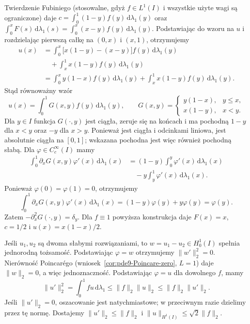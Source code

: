 \begin{przyklad}
Twierdzenie Fubiniego (stosowalne, gdyż $f\in L^1(I)$
i wszystkie użyte wagi są ograniczone) daje
$c=\int_0^1(1-y)f(y)\,\mathrm d\lambda_1(y)$ oraz
$\int_0^xF(s)\,\mathrm d\lambda_1(s)
=\int_0^x(x-y)f(y)\,\mathrm d\lambda_1(y)$.
Podstawiając do wzoru na $u$ i rozdzielając
pierwszą całkę na $(0,x)$ i $(x,1)$, otrzymujemy
\[
 \begin{aligned}
 u(x)
 &=\int_0^x\bigl[x(1-y)-(x-y)\bigr]f(y)\,
                  \mathrm d\lambda_1(y)\\
 &\quad+\int_x^1 x(1-y)f(y)\,\mathrm d\lambda_1(y)\\
 &=\int_0^x y(1-x)f(y)\,\mathrm d\lambda_1(y)
   +\int_x^1 x(1-y)f(y)\,\mathrm d\lambda_1(y).
 \end{aligned}
\]
Stąd równoważny wzór
\[
 u(x)=\int_0^1G(x,y)f(y)\,\mathrm d\lambda_1(y),\qquad
 G(x,y)=\begin{cases}y(1-x),&y\le x,\\x(1-y),&x<y.\end{cases}
\]
Dla $y\in I$ funkcja $G(\cdot,y)$ jest ciągła,
zeruje się na końcach i ma pochodną $1-y$ dla $x<y$
oraz $-y$ dla $x>y$. Ponieważ jest ciągła
i odcinkami liniowa, jest absolutnie ciągła na $[0,1]$;
wskazana pochodna jest więc również pochodną słabą.
Dla $\varphi\in C_c^\infty(I)$ mamy
\[
 \begin{aligned}
 \int_0^1\partial_xG(x,y)\varphi'(x)\,\mathrm d\lambda_1(x)
 &=(1-y)\int_0^y\varphi'(x)\,\mathrm d\lambda_1(x)\\
 &\quad-y\int_y^1\varphi'(x)\,\mathrm d\lambda_1(x).
 \end{aligned}
\]
Ponieważ $\varphi(0)=\varphi(1)=0$, otrzymujemy
\[
 \int_0^1\partial_xG(x,y)\varphi'(x)\,\mathrm d\lambda_1(x)
 =(1-y)\varphi(y)+y\varphi(y)=\varphi(y).
\]
Zatem $-\partial_x^2G(\cdot,y)=\delta_y$.
Dla $f\equiv1$ powyższa konstrukcja daje $F(x)=x$,
$c=1/2$ i $u(x)=x(1-x)/2$.

Jeśli $u_1,u_2$ są dwoma słabymi rozwiązaniami,
to $w=u_1-u_2\in H_0^1(I)$ spełnia jednorodną
tożsamość. Podstawiając $\varphi=w$ otrzymujemy
$\|w'\|_2^2=0$. Nierówność Poincarégo
(wniosek~\ref{cor:pde9-Poincare-zero}, $L=1$)
daje $\|w\|_2=0$, a więc jednoznaczność.
Podstawiając $\varphi=u$ dla dowolnego $f$, mamy
\[
 \|u'\|_2^2=\int_0^1fu\,\mathrm d\lambda_1
 \le\|f\|_2\|u\|_2\le\|f\|_2\|u'\|_2 .
\]
Jeśli $\|u'\|_2=0$, oszacowanie jest natychmiastowe;
w przeciwnym razie dzielimy przez tę normę.
Dostajemy $\|u'\|_2\le\|f\|_2$ i
$\|u\|_{H^1(I)}\le\sqrt{2}\|f\|_2$.
\end{przyklad}

